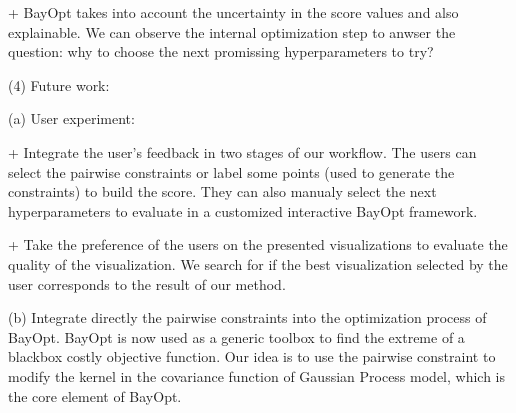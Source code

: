 + BayOpt takes into account the uncertainty in the score values and also explainable. We can observe the internal optimization step to anwser the question: why to choose the next promissing hyperparameters to try?


\vspace{8pt}
\par (4) Future work:

(a) User experiment:

+ Integrate the user's feedback in two stages of our workflow.
The users can select the pairwise constraints or label some points (used to generate the constraints) to build the score.
They can also manualy select the next hyperparameters to evaluate in a customized interactive BayOpt framework.

+ Take the preference of the users on the presented visualizations to evaluate the quality of the visualization. We search for if the best visualization selected by the user corresponds to the result of our method.


(b) Integrate directly the pairwise constraints into the optimization process of BayOpt.
BayOpt is now used as a generic toolbox to find the extreme of a blackbox costly objective function.
Our idea is to use the pairwise constraint to modify the kernel in the covariance function of Gaussian Process model, which is the core element of BayOpt.
